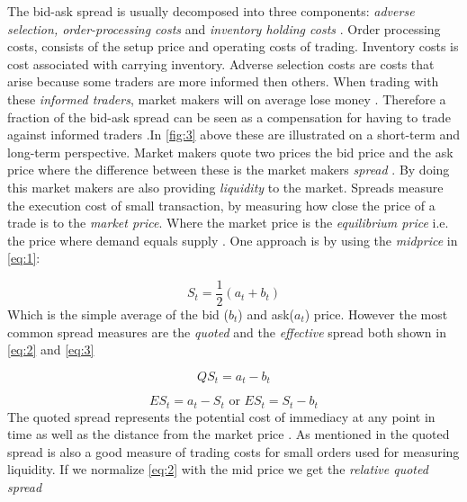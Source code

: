\documentclass{kththesis}
\theoremstyle{definition}
\begin{document}
The bid-ask spread is usually decomposed into three components: \textit{adverse selection, order-processing costs} and \textit{inventory holding costs} \parencite{foucault2013market}. Order processing costs, consists of the setup price and operating costs of trading. Inventory costs is cost associated with carrying inventory. Adverse selection costs are costs that arise because some traders are more informed then others. When trading with these \textit{informed traders}, market makers will on average lose money \parencite{darley2007nasdaq}. Therefore a fraction of the bid-ask spread can be seen as a compensation for having to trade against informed traders \parencite{darley2007nasdaq}.In \autoref{fig:3} above these are illustrated on a short-term and long-term perspective.
\newline
\newline
Market makers quote two prices the bid price and the ask price where the difference between these is the market makers \textit{spread} \parencite{madhavan2000market}. By doing this market makers are also providing \textit{liquidity} to the market. Spreads measure the execution cost of small transaction, by measuring how close the price of a trade is to the \textit{market price}. Where the market price is the \textit{equilibrium price} i.e. the price where demand equals supply \parencite{cartea2015algorithmic}. One approach is by using the \textit{midprice} in \autoref{eq:1}:

\begin{equation}
    \label{eq:1}
    S_{t} = \frac{1}{2}(a_t + b_t)
\end{equation}
Which is the simple average of the bid ($b_t$) and ask($a_t$) price.
However the most common spread measures are the \textit{quoted} and the \textit{effective} \parencite{cartea2015algorithmic, foucault2013market} spread both shown in \autoref{eq:2} and \autoref{eq:3}

\begin{equation}
    \label{eq:2}
    QS_t = a_t - b_t
\end{equation}

\begin{equation}
    \label{eq:3}
    ES_t = a_t - S_t \text{ or } ES_t = S_t - b_t
\end{equation}
The quoted spread represents the potential cost of immediacy at any point in time as well as the distance from the market price \parencite{cartea2015algorithmic}. As mentioned in \textcite{foucault2013market} the quoted spread is also a good measure of trading costs for small orders used for measuring liquidity. If we normalize \autoref{eq:2} with the mid price we get the \textit{relative quoted spread} 
\end{document}
